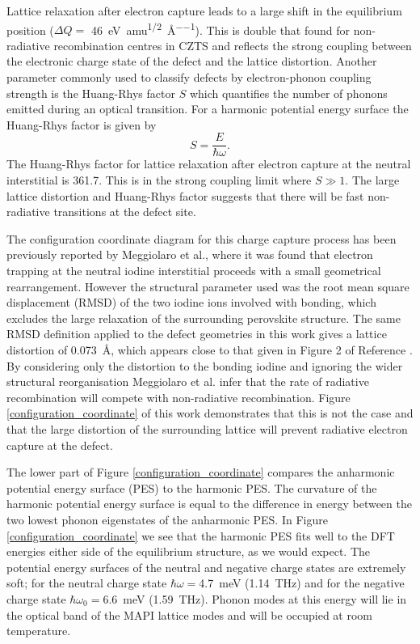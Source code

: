 Lattice relaxation after electron capture leads to a large shift in the equilibrium position ($\Delta Q=$ \SI{46}{\electronvolt\per amu\tothe{1/2}\per\angstrom}).
This is double that found for non-radiative recombination centres in CZTS\autocite{Kim2018} and reflects the strong coupling between the electronic charge state of the defect and the lattice distortion. 
Another parameter commonly used to classify defects by electron-phonon coupling strength is the Huang-Rhys factor $S$ which quantifies the number of phonons emitted during an optical transition. For a harmonic potential energy surface the Huang-Rhys factor is given by 
\begin{equation}
S = \frac{E}{\hbar\omega}.
\end{equation}
The Huang-Rhys factor for lattice relaxation after electron capture at the neutral interstitial is 361.7. This is in the strong coupling limit where $S\gg1$. The large lattice distortion and Huang-Rhys factor suggests that there will be fast non-radiative transitions at the defect site.\autocite{Hayes1985,Hughes1967}

The configuration coordinate diagram for this charge capture process has been previously reported by Meggiolaro et al.,\autocite{Meggiolaro2018} where it was found that electron trapping at the neutral iodine interstitial proceeds with a small geometrical rearrangement. However the structural parameter used was the root mean square displacement (RMSD) of the two iodine ions involved with bonding, which excludes the large relaxation of the surrounding perovskite structure. The same RMSD definition applied to the defect geometries in this work gives a lattice distortion of \SI{0.073}{\angstrom}, which appears close to that given in Figure 2 of Reference \cite{Meggiolaro2018}. By considering only the distortion to the bonding iodine and ignoring the wider structural reorganisation Meggiolaro et al. infer that the rate of radiative recombination will compete with non-radiative recombination. Figure \ref{configuration_coordinate} of this work demonstrates that this is not the case and that the large distortion of the surrounding lattice will prevent radiative electron capture at the defect.

The lower part of Figure \ref{configuration_coordinate} compares the anharmonic potential energy surface (PES) to the harmonic PES. The curvature of the harmonic potential energy surface is equal to the difference in energy between the two lowest phonon eigenstates of the anharmonic PES. In Figure \ref{configuration_coordinate} we see that the harmonic PES fits well to the DFT energies either side of the equilibrium structure, as we would expect. The potential energy surfaces of the neutral and negative charge states are extremely soft; for the neutral charge state $\hbar\omega=$\SI{4.7}{meV} (\SI{1.14}{\tera\hertz}) and for the negative charge state $\hbar\omega_0=$\SI{6.6}{meV} (\SI{1.59}{\tera\hertz}). Phonon modes at this energy will lie in the optical band of the MAPI lattice modes and will be occupied at room temperature.

